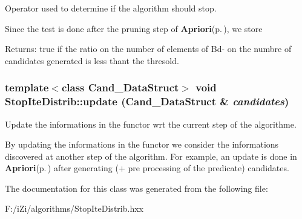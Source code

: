 Operator used to determine if the algorithm should stop. 

Since the test is done after the pruning step of {\bf Apriori}{\rm (p.\,\pageref{class_apriori})}, we store \begin{Desc}
\item[Returns:]true if the ratio on the number of elements of Bd- on the numbre of candidates generated is less thant the thresold. \end{Desc}
\subsubsection{\setlength{\rightskip}{0pt plus 5cm}template$<$class Cand\_\-Data\-Struct$>$ void Stop\-Ite\-Distrib::update (Cand\_\-Data\-Struct \& {\em candidates})\hspace{0.3cm}{\tt  [inline]}}\label{class_stop_ite_distrib_70910a2a1fd59c7ba5873088891e4d2b}


Update the informations in the functor wrt the current step of the algorithme. 

By updating the informations in the functor we consider the informations discovered at another step of the algorithm. For example, an update is done in {\bf Apriori}{\rm (p.\,\pageref{class_apriori})} after generating (+ pre processing of the predicate) candidates. 

The documentation for this class was generated from the following file:\begin{CompactItemize}
\item 
F:/i\-Zi/algorithms/Stop\-Ite\-Distrib.hxx\end{CompactItemize}

